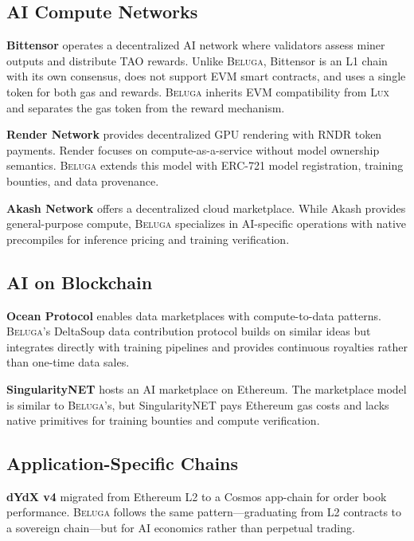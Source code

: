 \documentclass[11pt,letterpaper]{article}
\newcommand{\Lux}{\textsc{Lux}}
\newcommand{\Beluga}{\textsc{Beluga}}
\begin{document}
\subsection{AI Compute Networks}

\textbf{Bittensor} \cite{bittensor2023} operates a decentralized AI network where validators assess miner outputs and distribute TAO rewards. Unlike \Beluga{}, Bittensor is an L1 chain with its own consensus, does not support EVM smart contracts, and uses a single token for both gas and rewards. \Beluga{} inherits EVM compatibility from \Lux{} and separates the gas token from the reward mechanism.

\textbf{Render Network} \cite{render2023} provides decentralized GPU rendering with RNDR token payments. Render focuses on compute-as-a-service without model ownership semantics. \Beluga{} extends this model with ERC-721 model registration, training bounties, and data provenance.

\textbf{Akash Network} \cite{akash2020} offers a decentralized cloud marketplace. While Akash provides general-purpose compute, \Beluga{} specializes in AI-specific operations with native precompiles for inference pricing and training verification.

\subsection{AI on Blockchain}

\textbf{Ocean Protocol} \cite{ocean2019} enables data marketplaces with compute-to-data patterns. \Beluga{}'s DeltaSoup data contribution protocol builds on similar ideas but integrates directly with training pipelines and provides continuous royalties rather than one-time data sales.

\textbf{SingularityNET} \cite{singularitynet2019} hosts an AI marketplace on Ethereum. The marketplace model is similar to \Beluga{}'s, but SingularityNET pays Ethereum gas costs and lacks native primitives for training bounties and compute verification.

\subsection{Application-Specific Chains}

\textbf{dYdX v4} \cite{dydx2023} migrated from Ethereum L2 to a Cosmos app-chain for order book performance. \Beluga{} follows the same pattern---graduating from L2 contracts to a sovereign chain---but for AI economics rather than perpetual trading.
\end{document}
